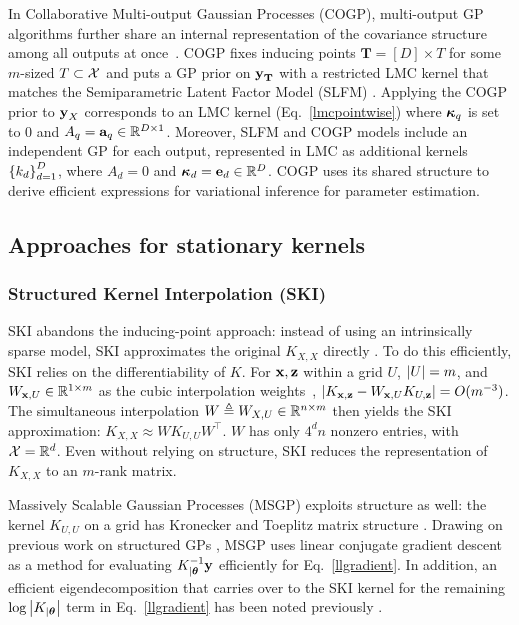 \documentclass{article}
\begin{document}
In Collaborative Multi-output Gaussian Processes (COGP), multi-output GP algorithms further share an internal representation of the covariance structure among all outputs at once~\cite{nguyen2014collaborative}. COGP fixes inducing points $\textbf{T}=[D]\times T$ for some $m$-sized $T\subset \mathcal{X}$ and puts a GP prior on $\textbf{y}_{\textbf{T}}$ with a restricted LMC kernel that matches the Semiparametric Latent Factor Model (SLFM) \cite{seeger2005semiparametric}. Applying the COGP prior to $\textbf{y}_X$ corresponds to an LMC kernel (Eq.~\ref{lmcpointwise}) where ${\boldsymbol\kappa}_q$ is set to 0 and $A_q=\textbf{a}_q\in\mathbb{R}^{D\times 1}$. Moreover, SLFM and COGP models include an independent GP for each output, represented in LMC as additional kernels $\left\{ k_d \right\}_{ d=1 }^{ D }$, where $A_d=0$ and ${\boldsymbol\kappa}_d=\textbf{e}_d\in\mathbb{R}^D$. COGP uses its shared structure to derive efficient expressions for variational inference for parameter estimation.

\subsection{Approaches for stationary kernels}

\subsubsection{Structured Kernel Interpolation (SKI)}\label{ski-section}

SKI abandons the inducing-point approach: instead of using an intrinsically sparse model, SKI approximates the original $K_{X,X}$ directly \cite{kiss-gp}. To do this efficiently, SKI relies on the differentiability of $K$. For $\textbf{x},\textbf{z}$ within a grid $U$, $\left\vert{U}\right\vert=m$, and $W_{\textbf{x},U}\in\mathbb{R}^{1\times m}$ as the cubic interpolation weights~\cite{keys1981cubic}, $\left|K_{\textbf{x},\textbf{z}}-W_{\textbf{x},U}K_{U,\textbf{z}}\right|=O(m^{-3})$. The simultaneous interpolation $W\triangleq W_{X,U}\in\mathbb{R}^{n\times m}$ then yields the SKI approximation: $K_{X,X}\approx WK_{U,U}W^\top$. $W$ has only $4^dn$ nonzero entries, with $\mathcal{X}=\mathbb{R}^d$. Even without relying on structure, SKI reduces the representation of $K_{X,X}$ to an $m$-rank matrix.

Massively Scalable Gaussian Processes (MSGP) exploits structure as well: the kernel $K_{U,U}$ on a grid has Kronecker and Toeplitz matrix structure \cite{msgp}. Drawing on previous work on structured GPs \cite{cunningham2008fast, gilboa2015scaling}, MSGP uses linear conjugate gradient descent as a method for evaluating $K_{|{\boldsymbol\theta}}^{-1}\textbf{y}$ efficiently for Eq.~\ref{llgradient}. In addition, an efficient eigendecomposition that carries over to the SKI kernel for the remaining $\log\left|K_{|{\boldsymbol\theta}}\right|$ term in Eq.~\ref{llgradient} has been noted previously \cite{wilson2014fast}.
\end{document}
